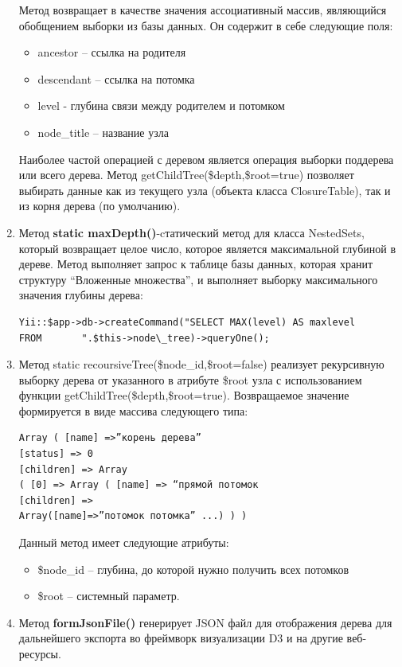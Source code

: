 \documentclass[a4paper,14pt]{extreport}
\theoremstyle{definition}
\begin{document}
\begin{enumerate}
Метод возвращает в качестве значения ассоциативный массив, являющийся обобщением выборки из базы данных. Он содержит в себе следующие поля:
\begin{itemize}
\item ancestor – ссылка на родителя
\item descendant – ссылка на потомка
\item level - глубина связи между родителем и потомком
\item node\_title – название узла
\end{itemize}
Наиболее частой операцией с деревом является операция выборки поддерева или всего дерева. Метод getChildTree(\$depth,\$root=true) позволяет выбирать данные как из текущего узла (объекта класса ClosureTable), так и из корня дерева (по умолчанию).
\item Метод \textbf{static maxDepth()}-cтатический метод для класса NestedSets, который возвращает целое число, которое является максимальной глубиной в дереве. Метод выполняет запрос к таблице базы данных, которая хранит структуру “Вложенные множества”, и выполняет выборку максимального значения глубины дерева:
\begin{verbatim}Yii::$app->db->createCommand("SELECT MAX(level) AS maxlevel
FROM       ".$this->node\_tree)->queryOne();\end{verbatim}
\item Метод static recoursiveTree(\$node\_id,\$root=false) реализует рекурсивную выборку дерева от указанного в атрибуте \$root узла с использованием функции getChildTree(\$depth,\$root=true). Возвращаемое значение формируется в виде массива следующего типа:
\begin{verbatim}Array ( [name] =>”корень дерева”
[status] => 0
[children] => Array
( [0] => Array ( [name] => “прямой потомок
[children] =>
Array([name]=>”потомок потомка” ...) ) )\end{verbatim}
Данный метод имеет следующие атрибуты:
\begin{itemize}
\item \$node\_id – глубина, до которой нужно получить всех потомков
\item \$root – системный параметр.
\end{itemize}
\item Метод \textbf{formJsonFile()} генерирует JSON файл для отображения дерева для дальнейшего экспорта во фреймворк визуализации D3 и на другие веб-ресурсы.


\end{enumerate}
\end{document}
